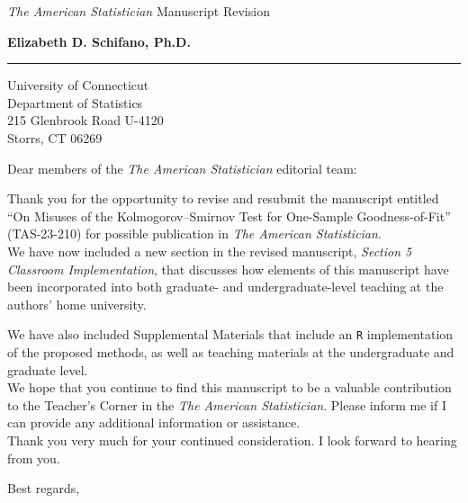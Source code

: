 \documentclass{letter} %
\begin{document}
\signature{Elizabeth D. Schifano \\elizabeth.schifano@uconn.edu \\Corresponding Author}           %
\longindentation=0pt                       %
\let\raggedleft\raggedright                %


\begin{letter}{

\textit{The American Statistician} Manuscript Revision}


\begin{flushleft}
{\large\bf Elizabeth D. Schifano, Ph.D.}
\end{flushleft}
\medskip\hrule height 1pt
\begin{flushright}
\hfill University of Connecticut \\
\hfill Department of Statistics \\ 
\hfill 215 Glenbrook Road U-4120 \\
\hfill Storrs, CT 06269
\end{flushright}
\vfill %

\opening{Dear members of the \textit{The American Statistician} editorial team:}
\vspace{.25in}

\noindent Thank you for the opportunity to revise and resubmit the manuscript 
entitled ``On Misuses of the Kolmogorov–Smirnov Test 
for One-Sample Goodness-of-Fit'' (TAS-23-210) for possible publication in 
\emph{The American Statistician}.\\

We have now included a new section in the revised manuscript, \textit{Section 5 
Classroom Implementation}, that discusses how elements of this manuscript have 
been incorporated into both graduate- and undergraduate-level teaching at the 
authors' home university. 

We have also included Supplemental Materials that include an \texttt{R} 
implementation of the proposed methods, as well as teaching materials at the 
undergraduate and graduate level. \\

We hope that you continue to find this manuscript to be a valuable contribution 
to the Teacher's Corner in the \emph{The American Statistician}. Please inform 
me if I can provide any additional information or assistance.  
\\

Thank you very much for your continued consideration. I look forward to hearing 
from you.\\

\closing{Best regards,}


~~\\

\end{letter}
\end{document}
